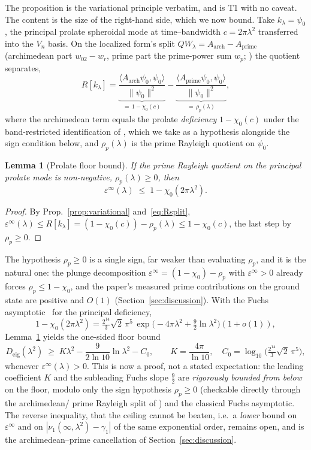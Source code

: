 \documentclass[11pt,a4paper]{article}
\newtheorem{lemma}{Lemma}
\begin{document}
\noindent The proposition is the variational principle verbatim, and is T1
with no caveat. The content is the size of the right-hand side, which we now
bound. Take $k_\lambda=\psi_0$, the principal prolate spheroidal mode at
time--bandwidth $c=2\pi\lambda^2$ transferred into the $V_n$ basis. On the
localized form's split $QW_\lambda=A_{\mathrm{arch}}-A_{\mathrm{prime}}$
(archimedean part $w_{02}-w_r$, prime part the prime-power sum $w_p$;
\cite[\S6]{CCM2025}) the quotient separates,
\begin{equation}\label{eq:Rsplit}
  R[k_\lambda]
   =\underbrace{\frac{\langle A_{\mathrm{arch}}\psi_0,\psi_0\rangle}{\|\psi_0\|^2}}
     _{=\,1-\chi_0(c)}
   -\underbrace{\frac{\langle A_{\mathrm{prime}}\psi_0,\psi_0\rangle}{\|\psi_0\|^2}}
     _{=\,\rho_p(\lambda)} ,
\end{equation}
where the archimedean term equals the prolate \emph{deficiency} $1-\chi_0(c)$
under the band-restricted identification of \cite[\S6.4]{CCM2025}, which we
take as a hypothesis alongside the sign condition below, and
$\rho_p(\lambda)$ is the prime Rayleigh quotient on $\psi_0$.

\begin{lemma}[Prolate floor bound]\label{lem:floorbound}
If the prime Rayleigh quotient on the principal prolate mode is non-negative,
$\rho_p(\lambda)\ge0$, then
\[
  \varepsilon^\infty(\lambda)\;\le\;1-\chi_0(2\pi\lambda^2).
\]
\end{lemma}
\begin{proof}
By Prop.~\ref{prop:variational} and~\eqref{eq:Rsplit},
$\varepsilon^\infty(\lambda)\le R[k_\lambda]=(1-\chi_0(c))-\rho_p(\lambda)
\le 1-\chi_0(c)$, the last step by $\rho_p\ge0$.
\end{proof}

\noindent The hypothesis $\rho_p\ge0$ is a single sign, far weaker than
evaluating $\rho_p$, and it is the natural one: the plunge decomposition
$\varepsilon^\infty=(1-\chi_0)-\rho_p$ with $\varepsilon^\infty>0$ already
forces $\rho_p\le1-\chi_0$, and the paper's measured prime contributions on the
ground state are positive and $O(1)$ (Section~\ref{sec:discussion}). With the
Fuchs asymptotic~\cite{Fuchs1964} for the principal deficiency,
\[
  1-\chi_0(2\pi\lambda^2)
   =\tfrac{2^{14}}{3}\sqrt2\,\pi^5\,
     \exp\!\bigl(-4\pi\lambda^2+\tfrac92\ln\lambda^2\bigr)(1+o(1)),
\]
Lemma~\ref{lem:floorbound} yields the one-sided floor bound
\[
  D_{\mathrm{eig}}(\lambda^2)\;\ge\;K\lambda^2-\frac{9}{2\ln10}\ln\lambda^2
  -C_0 ,\qquad K=\frac{4\pi}{\ln10},\quad
  C_0=\log_{10}\!\bigl(\tfrac{2^{14}}{3}\sqrt2\,\pi^5\bigr),
\]
whenever $\varepsilon^\infty(\lambda)>0$. This is now a proof, not a stated
expectation: the leading coefficient $K$ and the subleading Fuchs slope
$\tfrac92$ are \emph{rigorously bounded from below} on the floor, modulo only
the sign hypothesis $\rho_p\ge0$ (checkable directly through the archimedean/
prime Rayleigh split of \cite[\S6]{CCM2025}) and the classical Fuchs asymptotic.
The reverse inequality,
that the ceiling cannot be beaten, i.e.\ a \emph{lower} bound on
$\varepsilon^\infty$ and on $|\nu_1(\infty,\lambda^2)-\gamma_1|$ of the same
exponential order, remains open, and is the archimedean--prime cancellation
of Section~\ref{sec:discussion}.
\end{document}
